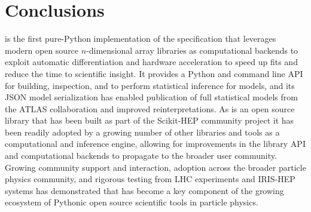 \section{Conclusions}\label{sec:conclusions}

\pyhf{} is the first pure-Python implementation of the \HiFa{} specification that leverages modern open source $n$-dimensional array libraries as computational backends to exploit automatic differentiation and hardware acceleration to speed up fits and reduce the time to scientific insight.
It provides a Python and command line API for building, inspection, and to perform statistical inference for \HiFa{} models, and its JSON model serialization has enabled publication of full statistical models from the ATLAS collaboration and improved reinterpretations.
As \pyhf{} is an open source library that has been built as part of the Scikit-HEP community project it has been readily adopted by a growing number of other libraries and tools as a computational and inference engine, allowing for improvements in the library API and computational backends to propagate to the broader user community.
Growing community support and interaction, adoption across the broader particle physics community, and rigorous testing from LHC experiments and IRIS-HEP systems has demonstrated that \pyhf{} has become a key component of the growing ecosystem of Pythonic open source scientific tools in particle physics.
